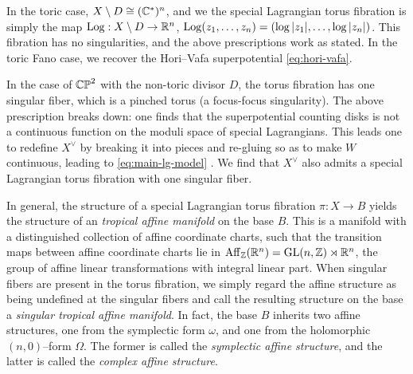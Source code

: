 \documentclass[12pt]{amsart}
\begin{document}
In the toric case, $X\setminus D \cong (\mathbb{C}^*)^n$, and we the special
Lagrangian torus fibration is simply the map $\mathrm{Log}: X\setminus D \to
\mathbb{R}^n$, $\mathrm{Log}(z_1,\dots,z_n) = (\log|z_1|,\dots,\log|z_n|)$. This
fibration has no singularities, and the above prescriptions work as
stated. In the toric Fano case, we recover the Hori--Vafa
superpotential \eqref{eq:hori-vafa}.

In the case of $\mathbb{CP}^2$ with the non-toric divisor $D$, the torus
fibration has one singular fiber, which is a pinched torus (a
focus-focus singularity). The above prescription breaks down: one
finds that the superpotential counting disks is not a continuous
function on the moduli space of special Lagrangians. This leads one to
redefine $X^\vee$ by breaking it into pieces and re-gluing so as to
make $W$ continuous, leading to \eqref{eq:main-lg-model} \cite{auroux07}. We find that $X^\vee$ also admits a
special Lagrangian torus fibration with one singular fiber.


In general, the structure of a special Lagrangian torus fibration
$\pi: X\to B$ yields the structure of an \emph{tropical affine
  manifold} on the base $B$. This is a manifold with a distinguished
collection of affine coordinate charts, such that the transition maps
between affine coordinate charts lie in $\mathrm{Aff}_\mathbb{Z}(\mathbb{R}^n) = \mathrm{GL}(n,\mathbb{Z})
\rtimes \mathbb{R}^n$, the group of affine linear transformations with
integral linear part. When singular fibers are present in the torus
fibration, we simply regard the affine structure as being undefined at
the singular fibers and call the resulting structure on the base a
\emph{singular tropical affine manifold}. In fact, the base $B$
inherits two affine structures, one from the symplectic form $\omega$,
and one from the holomorphic $(n,0)$--form $\Omega$. The former is
called the \emph{symplectic affine structure}, and the latter is
called the \emph{complex affine structure}.
\end{document}
